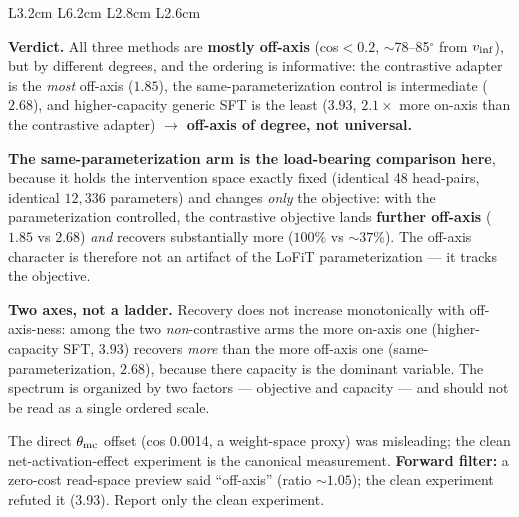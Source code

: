 \begin{table}[tbp]
\begin{threeparttable}
\begin{tabular}{L{3.2cm} L{6.2cm} L{2.8cm} L{2.6cm}}
\bottomrule
\end{tabular}
\begin{tablenotes}[flushleft]\footnotesize
\item \textbf{Verdict.} All three methods are \textbf{mostly off-axis} (cos${<}0.2$,
${\sim}$78--85$^{\circ}$ from $v_{\mathrm{inf}}$), but by different degrees, and the ordering is
informative: the contrastive adapter is the \emph{most} off-axis ($1.85$), the
same-parameterization control is intermediate ($2.68$), and higher-capacity generic
SFT is the least ($3.93$, $2.1\times$ more on-axis than the contrastive adapter)
$\rightarrow$ \textbf{off-axis of degree, not universal.}
\item \textbf{The same-parameterization arm is the load-bearing comparison here},
because it holds the intervention space exactly fixed (identical 48 head-pairs,
identical $12{,}336$ parameters) and changes \emph{only} the objective: with the
parameterization controlled, the contrastive objective lands
\textbf{further off-axis} ($1.85$ vs $2.68$) \emph{and} recovers substantially more
($100\%$ vs ${\sim}37\%$). The off-axis character is therefore not an artifact of the
LoFiT parameterization --- it tracks the objective.
\item \textbf{Two axes, not a ladder.} Recovery does not increase monotonically with
off-axis-ness: among the two \emph{non}-contrastive arms the more on-axis one
(higher-capacity SFT, $3.93$) recovers \emph{more} than the more off-axis one
(same-parameterization, $2.68$), because there capacity is the dominant variable. The
spectrum is organized by two factors --- objective and capacity --- and should not be
read as a single ordered scale.
\item The direct $\theta_{\mathrm{mc}}$ offset (cos 0.0014, a weight-space proxy) was misleading;
the clean net-activation-effect experiment is the canonical measurement.
\textbf{Forward filter:} a zero-cost read-space preview said ``off-axis'' (ratio
${\sim}1.05$); the clean experiment refuted it (3.93). Report only the clean
experiment.
\end{tablenotes}
\end{threeparttable}
\end{table}

